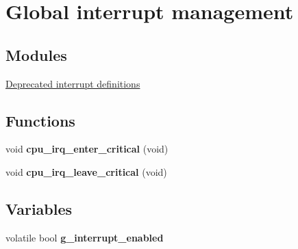 \hypertarget{group__interrupt__group}{}\section{Global interrupt management}
\label{group__interrupt__group}
\subsection*{Modules}
\begin{DoxyCompactItemize}
\item 
\hyperlink{group__interrupt__deprecated__group}{Deprecated interrupt definitions}
\end{DoxyCompactItemize}
\subsection*{Functions}
\begin{DoxyCompactItemize}
\item 
\hypertarget{group__interrupt__group_ga2b5f1a58b98aea52fbe094636054d910}{}void {\bfseries cpu\+\_\+irq\+\_\+enter\+\_\+critical} (void)\label{group__interrupt__group_ga2b5f1a58b98aea52fbe094636054d910}

\item 
\hypertarget{group__interrupt__group_gad9a7e953e4e3eb6bde58eb1c81092b43}{}void {\bfseries cpu\+\_\+irq\+\_\+leave\+\_\+critical} (void)\label{group__interrupt__group_gad9a7e953e4e3eb6bde58eb1c81092b43}

\end{DoxyCompactItemize}
\subsection*{Variables}
\begin{DoxyCompactItemize}
\item 
\hypertarget{group__interrupt__group_ga18a272af1cdb2009183461e1647f4e86}{}volatile bool {\bfseries g\+\_\+interrupt\+\_\+enabled}\label{group__interrupt__group_ga18a272af1cdb2009183461e1647f4e86}

\end{DoxyCompactItemize}
